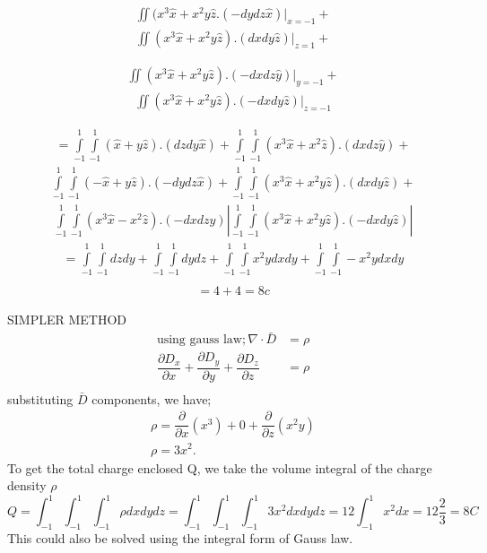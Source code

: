 \begin{exmp}
\begin{align*}
\iint\limits(x^3 \hat{x}+ x^2y\hat{z}.(-dydz\hat{x})|_{x=-1}+
\end{align*}
\begin{align*}
\iint\limits(x^3 \hat{x}+ x^2y\hat{z}).(dxdy \hat{z})|_{z=1}+
\end{align*}

\begin{align*}
\iint\limits(x^3 \hat{x}+ x^2y\hat{z}).(-dxdz\hat{y})|_{y=-1}+
\end{align*}
\begin{align*}
\iint\limits(x^3 \hat{x}+ x^2y\hat{z}).(-dxdy\hat{z})|_{z=-1} 
\end{align*}

\begin{align*}
={\int\limits_{-1}^{1}\int\limits_{-1}^{1}}(\hat{x}+y\hat{z}).(dzdy\hat{x})+{\int\limits_{-1}^{1}\int\limits_{-1}^{1}}(x^3 \hat{x}+ x^2\hat{z}).(dxdz\hat{y})+
\end{align*}
\begin{align*}
{\int\limits_{-1}^{1}\int\limits_{-1}^{1}}( -\hat{x}+ y\hat{z}).(-dydz\hat{x})+
{\int\limits_{-1}^{1}\int\limits_{-1}^{1}}(x^3 \hat{x}+ x^2y\hat{z}).(dxdy \hat{z})+
\end{align*}
\begin{align*}
{\int\limits_{-1}^{1}\int\limits_{-1}^{1}}(x^3 \hat{x}- x^2\hat{z}).(-dxdz\hat{y})|
{\int\limits_{-1}^{1}\int\limits_{-1}^{1}}(x^3 \hat{x}+ x^2y\hat{z}).(-dxdy\hat{z})|
\end{align*}
\begin{align*}
={\int\limits_{-1}^{1}\int\limits_{-1}^{1}}dzdy + {\int\limits_{-1}^{1}\int\limits_{-1}^{1}}dydz +
{\int\limits_{-1}^{1}\int\limits_{-1}^{1}}x^2ydxdy +
{\int\limits_{-1}^{1}\int\limits_{-1}^{1}}-x^2ydxdy\\
\end{align*}
\begin{align*}
=4+4 = 8c
\end{align*}




SIMPLER METHOD	 
\begin{align*}
\text{using gauss law}; \nabla\cdot\bar{D}&=\rho\\
\dfrac{\partial D_{x}}{\partial x}+\dfrac{\partial D_{y}}{\partial y}+\dfrac{\partial 
D_{z}}{\partial z}&=\rho \\
\end{align*}
substituting $\bar{D}$ components, we have;
\begin{align*}
\rho= \dfrac{\partial}{\partial x}(x^{3})+ 0 +\dfrac{\partial }{\partial z}(x^{2}y)\\
\rho=3x^{2} .
\end{align*}
To get the total charge enclosed Q, we take the volume integral of the charge density $\rho$
\begin{dmath*}
Q=\int_{-1}^{1}\int_{-1}^{1}\int_{-1}^{1}\rho dxdydz
=\int_{-1}^{1}\int_{-1}^{1}\int_{-1}^{1}3x^{2}dxdydz
=12\int_{-1}^{1}x^{2}dx= 12\frac{2}{3}
= 8 C
\end{dmath*}
This could also be solved using the integral form of Gauss law.
\end{exmp}

